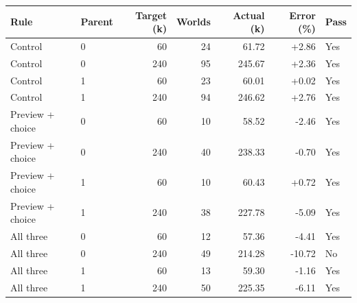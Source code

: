 \begin{tabular}{llrrrrl}
\toprule
Rule & Parent & Target (k) & Worlds & Actual (k) & Error (\%) & Pass \\
\midrule
Control & 0 & 60 & 24 & 61.72 & +2.86 & Yes \\
Control & 0 & 240 & 95 & 245.67 & +2.36 & Yes \\
Control & 1 & 60 & 23 & 60.01 & +0.02 & Yes \\
Control & 1 & 240 & 94 & 246.62 & +2.76 & Yes \\
Preview + choice & 0 & 60 & 10 & 58.52 & -2.46 & Yes \\
Preview + choice & 0 & 240 & 40 & 238.33 & -0.70 & Yes \\
Preview + choice & 1 & 60 & 10 & 60.43 & +0.72 & Yes \\
Preview + choice & 1 & 240 & 38 & 227.78 & -5.09 & Yes \\
All three & 0 & 60 & 12 & 57.36 & -4.41 & Yes \\
All three & 0 & 240 & 49 & 214.28 & -10.72 & No \\
All three & 1 & 60 & 13 & 59.30 & -1.16 & Yes \\
All three & 1 & 240 & 50 & 225.35 & -6.11 & Yes \\
\bottomrule
\end{tabular}
